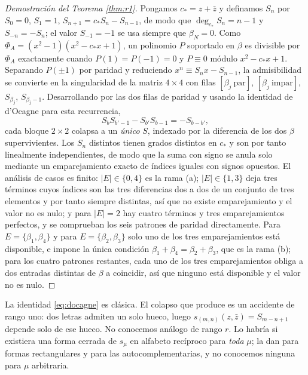 \documentclass[11pt,reqno]{amsart}
\theoremstyle{plain}
\theoremstyle{definition}
\begin{document}
\begin{proof}[Demostración del Teorema \ref{thm:r1}]
Pongamos $c_\ast=z+\bar z$ y definamos $S_n$ por $S_0=0$, $S_1=1$, $S_{n+1}=c_\ast S_n-S_{n-1}$, de
modo que $\deg_{c_\ast}S_n=n-1$ y $S_{-n}=-S_n$; el valor $S_{-1}=-1$ se usa siempre que
$\beta_N=0$. Como $\Phi_A=(x^2-1)(x^2-c_\ast x+1)$, un polinomio $P$ soportado en $\beta$ es
divisible por $\Phi_A$ exactamente cuando $P(1)=P(-1)=0$ y $P\equiv0$ módulo $x^2-c_\ast x+1$.
Separando $P(\pm1)$ por paridad y reduciendo $x^n\equiv S_nx-S_{n-1}$, la admisibilidad se convierte
en la singularidad de la matriz $4\times4$ con filas $[\beta_j\ \mathrm{par}]$,
$[\beta_j\ \mathrm{impar}]$, $S_{\beta_j}$, $S_{\beta_j-1}$. Desarrollando por las dos filas de
paridad y usando la identidad de d'Ocagne \cite{Doc} para esta recurrencia,
\begin{equation}\label{eq:docagne}
S_bS_{b'-1}-S_{b'}S_{b-1}=-S_{b-b'},
\end{equation}
cada bloque $2\times2$ colapsa a un \emph{único} $S$, indexado por la diferencia de los dos $\beta$
supervivientes. Los $S_n$ distintos tienen grados distintos en $c_\ast$ y son por tanto linealmente
independientes, de modo que la suma con signo se anula solo mediante un emparejamiento exacto de
índices iguales con signos opuestos. El análisis de casos es finito: $|E|\in\{0,4\}$ es la rama (a);
$|E|\in\{1,3\}$ deja tres términos cuyos índices son las tres diferencias dos a dos de un conjunto de
tres elementos y por tanto siempre distintas, así que no existe emparejamiento y el valor no es nulo;
y para $|E|=2$ hay cuatro términos y tres emparejamientos perfectos, y se comprueban los seis
patrones de paridad directamente. Para $E=\{\beta_1,\beta_4\}$ y para $E=\{\beta_2,\beta_3\}$ solo
uno de los tres emparejamientos está disponible, e impone la única condición
$\beta_1+\beta_4=\beta_2+\beta_3$, que es la rama (b); para los cuatro patrones restantes, cada uno
de los tres emparejamientos obliga a dos entradas distintas de $\beta$ a coincidir, así que ninguno
está disponible y el valor no es nulo.
\end{proof}

La identidad \eqref{eq:docagne} es clásica. El colapso que produce es un accidente de rango uno: dos
letras admiten un solo hueco, luego $s_{(m,n)}(z,\bar z)=S_{m-n+1}$ depende solo de ese hueco. No conocemos
análogo de rango $r$. Lo habría si existiera una forma cerrada de $s_\mu$ en alfabeto recíproco para
\emph{toda} $\mu$; \cite{CK09} la dan para formas rectangulares y \cite{AB19} para las
autocomplementarias, y no conocemos ninguna para $\mu$ arbitraria.
\end{document}
